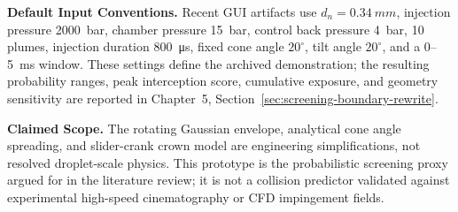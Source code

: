 \textbf{Default Input Conventions.} Recent GUI artifacts use \(d_n=\SI{0.34}{mm}\), injection pressure \SI{2000}{bar}, chamber pressure \SI{15}{bar}, control back pressure \SI{4}{bar}, 10 plumes, injection duration \SI{800}{\micro s}, fixed cone angle \(20^{\circ}\), tilt angle \(20^{\circ}\), and a 0--\SI{5}{ms} window. These settings define the archived demonstration; the resulting probability ranges, peak interception score, cumulative exposure, and geometry sensitivity are reported in Chapter~5, Section~\ref{sec:screening-boundary-rewrite}.

\textbf{Claimed Scope.} The rotating Gaussian envelope, analytical cone angle spreading, and slider-crank crown model are engineering simplifications, not resolved droplet-scale physics. This prototype is the probabilistic screening proxy argued for in the literature review; it is not a collision predictor validated against experimental high-speed cinematography or CFD impingement fields.

